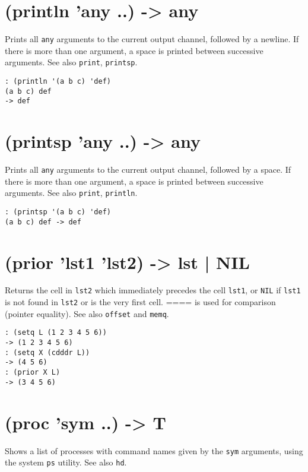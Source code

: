 {{{{{{{ 
\section{(println 'any ..) -> any}
\label{sec-8-1-16-32}


Prints all \texttt{any} arguments to the current output channel, followed by a
newline. If there is more than one argument, a space is printed between
successive arguments. See also \texttt{print}, \texttt{printsp}.


\begin{verbatim}
: (println '(a b c) 'def)
(a b c) def
-> def
\end{verbatim}

 
\section{(printsp 'any ..) -> any}
\label{sec-8-1-16-33}


Prints all \texttt{any} arguments to the current output channel, followed by a
space. If there is more than one argument, a space is printed between
successive arguments. See also \texttt{print}, \texttt{println}.


\begin{verbatim}
: (printsp '(a b c) 'def)
(a b c) def -> def
\end{verbatim}

 
\section{(prior 'lst1 'lst2) -> lst | NIL}
\label{sec-8-1-16-34}


Returns the cell in \texttt{lst2} which immediately precedes the cell \texttt{lst1},
or \texttt{NIL} if \texttt{lst1} is not found in \texttt{lst2} or is the very first cell.
==== is used for comparison (pointer equality). See also \texttt{offset} and
\texttt{memq}.


\begin{verbatim}
: (setq L (1 2 3 4 5 6))
-> (1 2 3 4 5 6)
: (setq X (cdddr L))
-> (4 5 6)
: (prior X L)
-> (3 4 5 6)
\end{verbatim}

 
\section{(proc 'sym ..) -> T}
\label{sec-8-1-16-35}


Shows a list of processes with command names given by the \texttt{sym}
arguments, using the system \texttt{ps} utility. See also \texttt{hd}.


}}}}}}}
